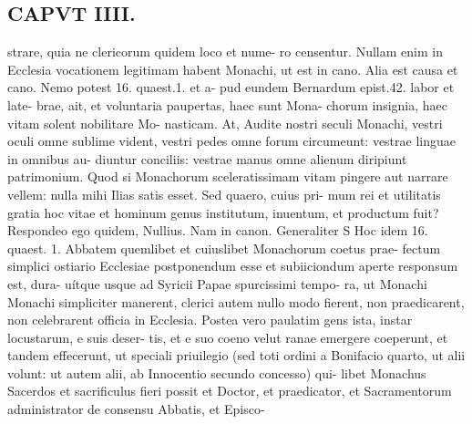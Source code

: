 \documentclass{article}
\begin{document}
\begin{pages}
\section*{CAPVT  IIII. }
\marginpar{[ p.223 ]}strare, quia ne clericorum quidem loco et nume- ro censentur. Nullam enim in Ecclesia vocationem legitimam habent Monachi, ut est in cano. Alia est causa et cano. Nemo potest 16. quaest.1. et a- pud eundem Bernardum epist.42. labor et late- brae, ait, et voluntaria paupertas, haec sunt Mona- chorum insignia, haec vitam solent nobilitare Mo- nasticam. At, Audite nostri seculi Monachi, vestri oculi omne sublime vident, vestri pedes omne forum circumeunt: vestrae linguae in omnibus au- diuntur conciliis: vestrae manus omne alienum diripiunt patrimonium. Quod si Monachorum sceleratissimam vitam pingere aut narrare vellem: nulla mihi Ilias satis esset. Sed quaero, cuius pri- mum rei et utilitatis gratia hoc vitae et hominum genus institutum, inuentum, et productum fuit? Respondeo ego quidem, Nullius. Nam in canon. Generaliter S Hoc idem 16. quaest. 1. Abbatem quemlibet et cuiuslibet Monachorum coetus prae- fectum simplici ostiario Ecclesiae postponendum esse et subiiciondum aperte responsum est, dura- uítque usque ad Syricii Papae spurcissimi tempo- ra, ut Monachi Monachi simpliciter manerent, clerici autem nullo modo fierent, non praedicarent, non celebrarent officia in Ecclesia. Postea vero paulatim gens ista, instar locustarum, e suis deser- tis, et e suo coeno velut ranae emergere coeperunt, et tandem effecerunt, ut speciali priuilegio (sed toti ordini a Bonifacio quarto, ut alii volunt: ut autem alii, ab Innocentio secundo concesso) qui- libet Monachus Sacerdos et sacrificulus fieri possit et Doctor, et praedicator, et Sacramentorum administrator de consensu Abbatis, et Episco- 

\end{pages}
\end{document}
